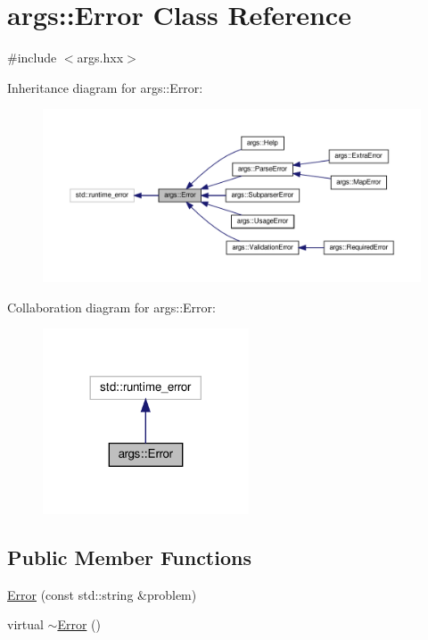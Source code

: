 \hypertarget{classargs_1_1_error}{}\section{args\+:\+:Error Class Reference}
\label{classargs_1_1_error}


{\ttfamily \#include $<$args.\+hxx$>$}



Inheritance diagram for args\+:\+:Error\+:\nopagebreak
\begin{figure}[H]
\begin{center}
\leavevmode
\includegraphics[width=350pt]{classargs_1_1_error__inherit__graph}
\end{center}
\end{figure}


Collaboration diagram for args\+:\+:Error\+:\nopagebreak
\begin{figure}[H]
\begin{center}
\leavevmode
\includegraphics[width=173pt]{classargs_1_1_error__coll__graph}
\end{center}
\end{figure}
\subsection*{Public Member Functions}
\begin{DoxyCompactItemize}
\item 
\hyperlink{classargs_1_1_error_a09eff0dde2175ef1645a30ff7e93b9b0}{Error} (const std\+::string \&problem)
\item 
virtual \hyperlink{classargs_1_1_error_aab8f2900dca29d20c3d84d89b40d9ccb}{$\sim$\+Error} ()
\end{DoxyCompactItemize}



